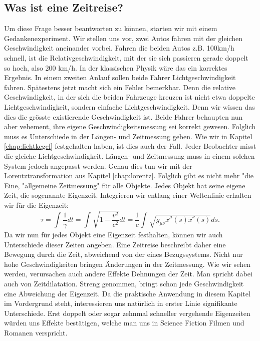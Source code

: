 \begin{refsection}
\section{Was ist eine Zeitreise?}
Um diese Frage besser beantworten zu können, starten wir mit einem Gedankenexperiment. Wir stellen uns vor, zwei Autos fahren mit der gleichen Geschwindigkeit aneinander vorbei. Fahren die beiden Autos z.B. 100km/h schnell, ist die Relativgeschwindigkeit, mit der sie sich passieren gerade doppelt so hoch, also 200 km/h. In der klassischen Physik wäre das ein korrektes Ergebnis. In einem zweiten Anlauf sollen beide Fahrer Lichtgeschwindigkeit fahren. Spätestens jetzt macht sich ein Fehler bemerkbar. Denn die relative Geschwindigkeit, in der sich die beiden Fahrzeuge kreuzen ist nicht etwa doppelte Lichtgeschwindigkeit, sondern einfache Lichtgeschwindigkeit. Denn wir wissen das dies die grösste existierende Geschwindigkeit ist.
Beide Fahrer behaupten nun aber vehement, ihre eigene Geschwindigkeitsmessung sei korrekt gewesen. Folglich muss es Unterschiede in der Längen- und Zeitmessung geben.
Wie wir in Kapitel \ref{chap:lichtkegel} festgehalten haben, ist dies auch der Fall. Jeder Beobachter misst die gleiche Lichtgeschwindigkeit. Längen- und Zeitmessung muss in einem solchen System jedoch angepasst werden. Genau dies tun wir mit der Lorentztransformation aus Kapitel \ref{chap:lorentz}. Folglich gibt es nicht mehr "die Eine, "allgemeine Zeitmessung" für alle Objekte. Jedes Objekt hat seine eigene Zeit, die sogenannte Eigenzeit.
Integrieren wir entlang einer Weltenlinie erhalten wir für die Eigenzeit:
\begin{equation}\label{Eigenzeit}
\tau
=
\int_{}^{}\frac{1}{\gamma}dt=\int_{}^{}\sqrt{1-\frac{v^2}{c^2}}dt
=
\frac{1}{c}\int_{}^{}\sqrt{g_{\mu\nu}\dot{x}^{\mu}(s)\dot{x}^{\nu}(s)}ds.
\end{equation}
Da wir nun für jedes Objekt eine Eigenzeit festhalten, können wir auch Unterschiede dieser Zeiten angeben.
Eine Zeitreise beschreibt daher eine Bewegung durch die Zeit, abweichend von der eines Bezugssystems. 
Nicht nur hohe Geschwindigkeiten bringen Änderungen in der Zeitmessung. Wie wir sehen werden, verursachen auch andere Effekte Dehnungen der Zeit. Man spricht dabei auch von Zeitdilatation.
Streng genommen, bringt schon jede Geschwindigkeit eine Abweichung der Eigenzeit. Da die praktische 	Anwendung in diesem Kapitel im Vordergrund steht, interessieren uns natürlich in erster Linie signifikante Unterschiede. Erst doppelt oder sogar zehnmal schneller vergehende Eigenzeiten w\"urden uns Effekte best\"atigen, welche man uns in Science Fiction Filmen und Romanen verspricht.

\end{refsection}
